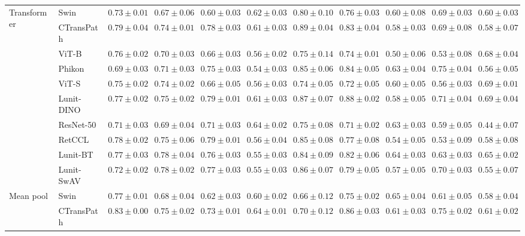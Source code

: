 \begin{tabular}{ll|cccc|c|cccc}
\cline{1-11}
\multirow[t]{10}{*}{Transformer} & Swin & $0.73 \pm 0.01$ & $0.67 \pm 0.06$ & $0.60 \pm 0.03$ & $0.62 \pm 0.03$ & $0.80 \pm 0.10$ & $0.76 \pm 0.03$ & $0.60 \pm 0.08$ & $0.69 \pm 0.03$ & $0.60 \pm 0.03$ \\
 & CTransPath & $\mathbf{0.79 \pm 0.04}$ & $0.74 \pm 0.01$ & $0.78 \pm 0.03$ & $0.61 \pm 0.03$ & $\mathbf{0.89 \pm 0.04}$ & $0.83 \pm 0.04$ & $0.58 \pm 0.03$ & $0.69 \pm 0.08$ & $0.58 \pm 0.07$ \\
 & ViT-B & $0.76 \pm 0.02$ & $0.70 \pm 0.03$ & $0.66 \pm 0.03$ & $0.56 \pm 0.02$ & $0.75 \pm 0.14$ & $0.74 \pm 0.01$ & $0.50 \pm 0.06$ & $0.53 \pm 0.08$ & $0.68 \pm 0.04$ \\
 & Phikon & $0.69 \pm 0.03$ & $0.71 \pm 0.03$ & $0.75 \pm 0.03$ & $0.54 \pm 0.03$ & $0.85 \pm 0.06$ & $0.84 \pm 0.05$ & $0.63 \pm 0.04$ & $\mathbf{0.75 \pm 0.04}$ & $0.56 \pm 0.05$ \\
 & ViT-S & $0.75 \pm 0.02$ & $0.74 \pm 0.02$ & $0.66 \pm 0.05$ & $0.56 \pm 0.03$ & $0.74 \pm 0.05$ & $0.72 \pm 0.05$ & $0.60 \pm 0.05$ & $0.56 \pm 0.03$ & $\mathbf{0.69 \pm 0.01}$ \\
 & Lunit-DINO & $0.77 \pm 0.02$ & $0.75 \pm 0.02$ & $0.79 \pm 0.01$ & $0.61 \pm 0.03$ & $0.87 \pm 0.07$ & $\mathbf{0.88 \pm 0.02}$ & $0.58 \pm 0.05$ & $0.71 \pm 0.04$ & $0.69 \pm 0.04$ \\
 & ResNet-50 & $0.71 \pm 0.03$ & $0.69 \pm 0.04$ & $0.71 \pm 0.03$ & $\mathbf{0.64 \pm 0.02}$ & $0.75 \pm 0.08$ & $0.71 \pm 0.02$ & $0.63 \pm 0.03$ & $0.59 \pm 0.05$ & $0.44 \pm 0.07$ \\
 & RetCCL & $0.78 \pm 0.02$ & $0.75 \pm 0.06$ & $\mathbf{0.79 \pm 0.01}$ & $0.56 \pm 0.04$ & $0.85 \pm 0.08$ & $0.77 \pm 0.08$ & $0.54 \pm 0.05$ & $0.53 \pm 0.09$ & $0.58 \pm 0.08$ \\
 & Lunit-BT & $0.77 \pm 0.03$ & $0.78 \pm 0.04$ & $0.76 \pm 0.03$ & $0.55 \pm 0.03$ & $0.84 \pm 0.09$ & $0.82 \pm 0.06$ & $\mathbf{0.64 \pm 0.03}$ & $0.63 \pm 0.03$ & $0.65 \pm 0.02$ \\
 & Lunit-SwAV & $0.72 \pm 0.02$ & $\mathbf{0.78 \pm 0.02}$ & $0.77 \pm 0.03$ & $0.55 \pm 0.03$ & $0.86 \pm 0.07$ & $0.79 \pm 0.05$ & $0.57 \pm 0.05$ & $0.70 \pm 0.03$ & $0.55 \pm 0.07$ \\
\cline{1-11}
\multirow[t]{10}{*}{Mean pool} & Swin & $0.77 \pm 0.01$ & $0.68 \pm 0.04$ & $0.62 \pm 0.03$ & $0.60 \pm 0.02$ & $0.66 \pm 0.12$ & $0.75 \pm 0.02$ & $0.65 \pm 0.04$ & $0.61 \pm 0.05$ & $0.58 \pm 0.04$ \\
 & CTransPath & $\mathbf{0.83 \pm 0.00}$ & $0.75 \pm 0.02$ & $0.73 \pm 0.01$ & $\mathbf{0.64 \pm 0.01}$ & $0.70 \pm 0.12$ & $0.86 \pm 0.03$ & $0.61 \pm 0.03$ & $0.75 \pm 0.02$ & $0.61 \pm 0.02$ \\

\end{tabular}
